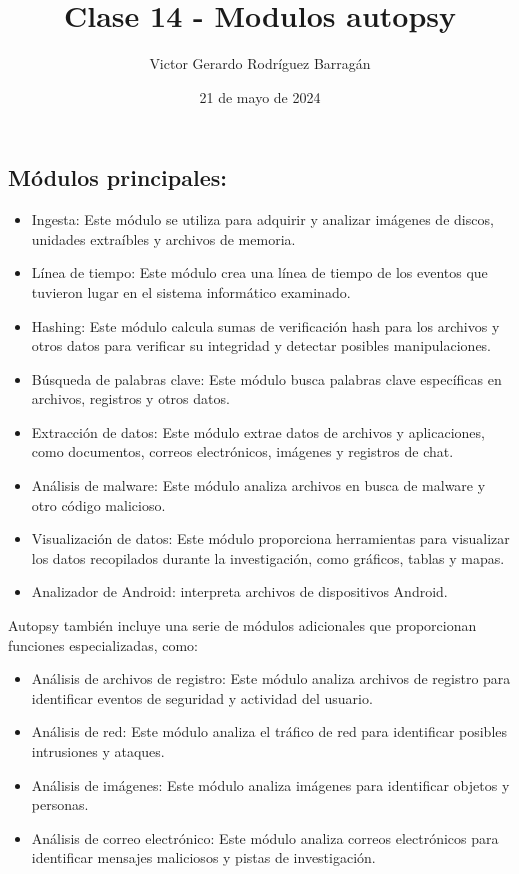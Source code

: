 \documentclass{article}
\title{Clase 14 - Modulos autopsy}
\author{Victor Gerardo Rodríguez Barragán}
\date{21 de mayo de 2024}
\begin{document}
\maketitle
\justify
\subsection*{Módulos principales:}
\begin{itemize}
    \item
    Ingesta: Este módulo se utiliza para adquirir y analizar imágenes de discos, unidades extraíbles y archivos de memoria.
    \item
    Línea de tiempo: Este módulo crea una línea de tiempo de los eventos que tuvieron lugar en el sistema informático examinado.
    \item
    Hashing: Este módulo calcula sumas de verificación hash para los archivos y otros datos para verificar su integridad y detectar posibles manipulaciones.
    \item
    Búsqueda de palabras clave: Este módulo busca palabras clave específicas en archivos, registros y otros datos.
    \item
    Extracción de datos: Este módulo extrae datos de archivos y aplicaciones, como documentos, correos electrónicos, imágenes y registros de chat.
    \item
    Análisis de malware: Este módulo analiza archivos en busca de malware y otro código malicioso.
    \item
    Visualización de datos: Este módulo proporciona herramientas para visualizar los datos recopilados durante la investigación, como gráficos, tablas y mapas.
    \item
    Analizador de Android: interpreta archivos de dispositivos Android.
\end{itemize}

Autopsy también incluye una serie de módulos adicionales que proporcionan funciones especializadas, como:
\begin{itemize}
    \item
    Análisis de archivos de registro: Este módulo analiza archivos de registro para identificar eventos de seguridad y actividad del usuario.
    \item
    Análisis de red: Este módulo analiza el tráfico de red para identificar posibles intrusiones y ataques.
    \item
    Análisis de imágenes: Este módulo analiza imágenes para identificar objetos y personas.
    \item
    Análisis de correo electrónico: Este módulo analiza correos electrónicos para identificar mensajes maliciosos y pistas de investigación.
\end{itemize}
\end{document}
